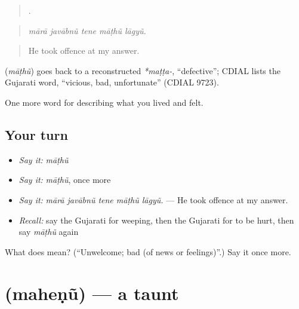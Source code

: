 \begin{quote}
    .
\end{quote}

\begin{quote}
\emph{mārā javābnũ tene māṭhũ lāgyũ.}
\end{quote}

\begin{quote}
He took offence at my answer.
\end{quote}

\begin{cousinweb}
\textbf{} (\emph{māṭhũ}) goes back to a reconstructed \emph{*maṭṭa-}, \textquotedblleft{}defective\textquotedblright{}; CDIAL lists the Gujarati word, \textquotedblleft{}vicious, bad, unfortunate\textquotedblright{} (CDIAL 9723).
\end{cousinweb}

\begin{grammarlens}[title={What you've built}]
One more word for describing what you lived and felt.
\end{grammarlens}

\subsection*{Your turn}
\begin{itemize}
\raggedright
  \item \emph{Say it:} \emph{māṭhũ}
  \item \emph{Say it:} \emph{māṭhũ}, once more
  \item \emph{Say it:} \emph{mārā javābnũ tene māṭhũ lāgyũ.} — He took offence at my answer.
  \item \emph{Recall:} say the Gujarati for weeping, then the Gujarati for to be hurt, then say \emph{māṭhũ} again
\end{itemize}

\begin{tcolorbox}[breakable,colback=teal!4,colframe=teal!35!black,title={Before you move on}]
What does  mean? (\textquotedblleft{}Unwelcome; bad (of news or feelings)\textquotedblright{}.) Say it once more.
\end{tcolorbox}
\section[\texorpdfstring{\gu{મહેણું} (maheṇũ)}{મહેણું (maheṇũ)}]{ (maheṇũ) — a taunt}


